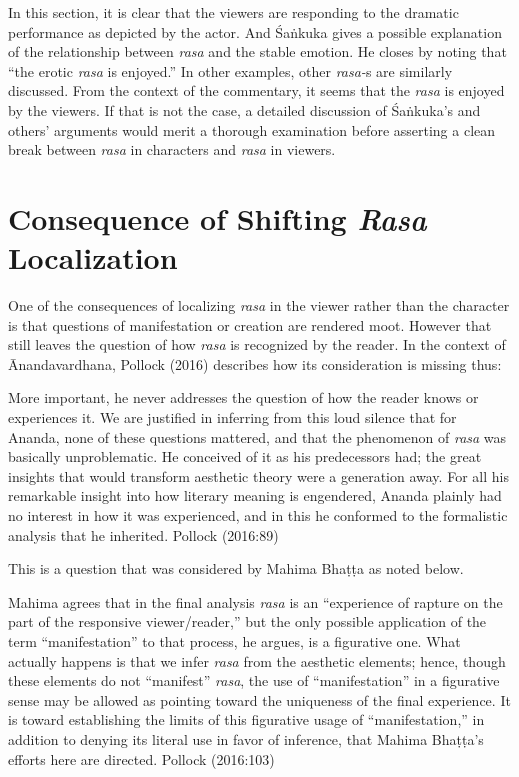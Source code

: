 In this section, it is clear that the viewers are responding to the dramatic performance as depicted by the actor. And Śaṅkuka gives a possible explanation of the relationship between \textsl{rasa} and the stable emotion. He closes by noting that “the erotic \textsl{rasa} is enjoyed.” In other examples, other \textsl{rasa-}s are similarly discussed. From the context of the commentary, it seems that the \textsl{rasa} is enjoyed by the viewers. If that is not the case, a detailed discussion of Śaṅkuka’s and others’ arguments would merit a thorough examination before asserting a clean break between \textsl{rasa} in characters and \textsl{rasa} in viewers. 

\section*{Consequence of Shifting \textsl{Rasa} Localization}

One of the consequences of localizing \textsl{rasa} in the viewer rather than the character is that questions of manifestation or creation are rendered moot. However that still leaves the question of how \textsl{rasa} is recognized by the reader. In the context of Ānandavardhana, Pollock (2016) describes how its consideration is missing thus: 

\begin{myquote}
More important, he never addresses the question of how the reader knows or experiences it. We are justified in inferring from this loud silence that for Ananda, none of these questions mattered, and that the phenomenon of \textsl{rasa} was basically unproblematic. He conceived of it as his predecessors had; the great insights that would transform aesthetic theory were a generation away. For all his remarkable insight into how literary meaning is engendered, Ananda plainly had no interest in how it was experienced, and in this he conformed to the formalistic analysis that he inherited.
\hfill Pollock (2016:89)
\end{myquote}

This is a question that was considered by Mahima Bhaṭṭa as noted below.

\begin{myquote}
Mahima agrees that in the final analysis \textsl{rasa} is an “experience of rapture on the part of the responsive viewer/reader,” but the only possible application of the term “manifestation” to that process, he argues, is a figurative one. What actually happens is that we infer \textsl{rasa} from the aesthetic elements; hence, though these elements do not “manifest” \textsl{rasa}, the use of “manifestation” in a figurative sense may be allowed as pointing toward the uniqueness of the final experience. It is toward establishing the limits of this figurative usage of “manifestation,” in addition to denying its literal use in favor of inference, that Mahima Bhaṭṭa’s efforts here are directed.
\hfill Pollock (2016:103)
\end{myquote}

